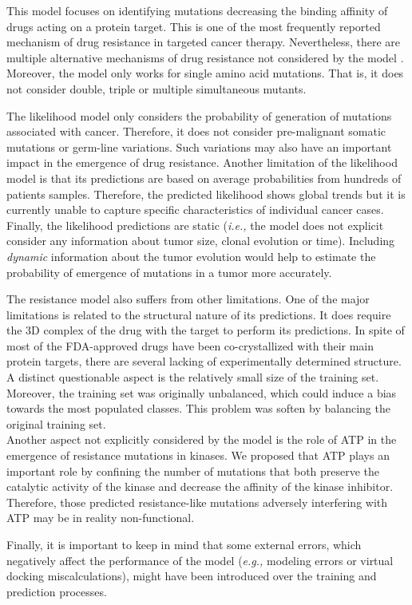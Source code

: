 \documentclass[11pt, b5paper,twoside]{tesi_upf}
\begin{document}
\par This model focuses on identifying mutations decreasing the binding affinity of drugs acting on a protein target. This is one of the most frequently reported mechanism of drug resistance in targeted cancer therapy. Nevertheless, there are multiple alternative mechanisms of drug resistance not considered by the model \cite{Holohan2013}. Moreover, the model only works for single amino acid mutations. That is, it does not consider double, triple or multiple simultaneous mutants.  
\par The likelihood model only considers the probability of generation of mutations associated with cancer. Therefore, it does not consider pre-malignant somatic mutations or germ-line variations. Such variations may also have an important impact in the emergence of drug resistance. Another limitation of the likelihood model is that its predictions are based on average probabilities from hundreds of patients samples. Therefore, the predicted likelihood shows global trends but it is currently unable to capture specific characteristics of individual cancer cases. Finally, the likelihood predictions are static (\textit{i.e.,} the model does not explicit consider any information about tumor size, clonal evolution or time). Including \textit{dynamic} information about the tumor evolution would help to estimate the probability of emergence of mutations in a tumor more accurately.  
\par The resistance model also suffers from other limitations. One of the major limitations is related to the structural nature of its predictions. It does require the 3D complex of the drug with the target to perform its predictions. In spite of most of the FDA-approved drugs have been co-crystallized with their main  protein targets, there are several lacking of experimentally determined structure. \\
A distinct questionable aspect is the relatively small size of the training set. Moreover, the training set was originally unbalanced, which could induce a bias towards the most populated classes. This problem was soften by balancing the original training set.\\
Another aspect not explicitly considered by the model is the role of ATP in the emergence of resistance mutations in kinases. We proposed that ATP plays an important role by confining the number of mutations that both preserve the catalytic activity of the kinase and decrease the affinity of the kinase inhibitor. Therefore, those  predicted resistance-like mutations adversely interfering with ATP may be in reality non-functional. 
\par Finally, it is important to keep in mind that some external errors, which negatively affect the performance of the model (\textit{e.g.,} modeling errors or virtual docking miscalculations), might have been introduced over the training and prediction processes.  
\end{document}
